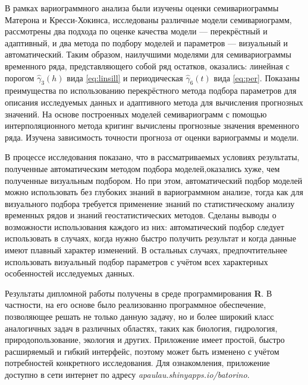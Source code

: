 В рамках вариограммного анализа были изучены оценки семивариограммы Матерона и Кресси-Хокинса, исследованы различные модели семивариограмм, рассмотрены два подхода по оценке качества модели --- перекрёстный и адаптивный, и два метода по подбору моделей и параметров --- визуальный и автоматический. Таким образом, наилучшими моделями для семивариограммы временного ряда, представляющего собой ряд остатков, оказались: линейная с порогом $ \widehat{\gamma}_3(h) $ вида \eqref{eq:linsill} и периодическая $\widehat{\gamma}_6(t) $ вида \eqref{eq:per}. Показаны преимущества по использованию перекрёстного метода подбора параметров для описания исследуемых данных и адаптивного метода для вычисления прогнозных значений. На основе построенных моделей семивариограмм с помощью интерполяционного метода кригинг вычислены прогнозные значения временного ряда. Изучена зависимость точности прогноза от оценки вариограммы и модели.

В процессе исследования показано, что в рассматриваемых условиях результаты, полученные автоматическим методом подбора моделей,оказались хуже, чем полученные визуальным подбором. Но при этом, автоматический подбор моделей можно использовать без глубоких знаний в вариограммном анализе, тогда как для визуального подбора требуется применение знаний по статистическому анализу временных рядов и знаний геостатистических методов. Сделаны выводы о возможности использования каждого из них: автоматический подбор следует использовать в случаях, когда нужно быстро получить результат и когда данные имеют плавный характер изменений. В остальных случаях, предпочтительнее использовать визуальный подбор параметров с учётом всех характерных особенностей исследуемых данных.

Результаты дипломной работы получены в среде программирования \textbf{R}. В частности, на его основе было реализованно программное обеспечение, позволяющее решать не только данную задачу, но и более широкий класс аналогичных задач в различных областях, таких как биология, гидрология, природопользование, экология и других. Приложение имеет простой, быстро расширяемый и гибкий интерфейс, поэтому может быть изменено с учётом потребностей конкретного исследования. Для ознакомления, приложение доступно в сети интернет по адресу \textit{apaulau.shinyapps.io/batorino}.